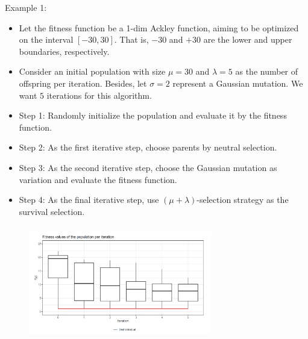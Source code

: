 \documentclass[11pt,compress,t,notes=noshow, xcolor=table]{beamer}
\begin{document}
\begin{vbframe}{Example 1:}

\begin{itemize}
\item Let the fitness function be a 1-dim Ackley function, aiming to be optimized on the interval $[-30, 30]$. That is, $-30$ and $+30$ are the lower and upper boundaries, respectively.
\item Consider an initial population with size $\mu=30$ and $\lambda=5$ as the number of offspring per iteration. Besides, let $\sigma=2$ represent a Gaussian mutation. We want $5$ iterations for this algorithm.
\item Step 1: Randomly initialize the population and evaluate it by the fitness function.
\item Step 2: As the first iterative step, choose parents by neutral selection.
\item Step 3: As the second iterative step, choose the Gaussian mutation as variation and evaluate the fitness function.
\item Step 4: As the final iterative step, use $(\mu + \lambda)$-selection strategy as the survival selection.
\end{itemize}

\framebreak

\vspace{1cm}
\begin{center}
\begin{figure}
  \includegraphics[height = 5cm, width = 8cm]{figure_man/example.png}
\end{figure}
\end{center}

\end{vbframe}
\end{document}
